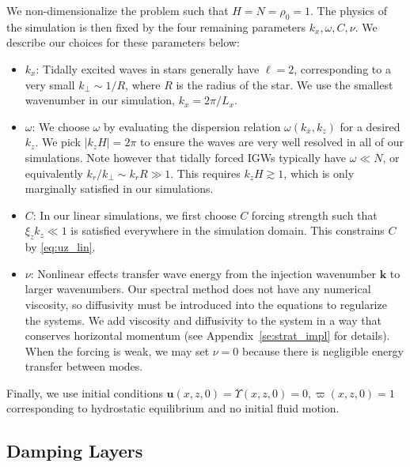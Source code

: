 \documentclass[
        fleqn,
        usenatbib,
    ]{mnras}
\newcommand*{\abs}[1]{\left|#1\right|}
\newcommand*{\bm}[1]{\mathbf{#1}}
\begin{document}
We non-dimensionalize the problem such that $H = N = \rho_0 = 1$. The physics of
the simulation is then fixed by the four remaining parameters $k_{x}, \omega, C,
\nu$. We describe our choices for these parameters below:
\begin{itemize}
    \item $k_{x}$: Tidally excited waves in stars generally have $\ell = 2$,
        corresponding to a very small $k_\perp\sim 1/R$, where $R$ is the radius
        of the star. We use the smallest wavenumber in our simulation,
        $k_x=2\pi/L_x$.

    \item $\omega$: We choose $\omega$ by evaluating the dispersion relation
        $\omega(k_x, k_z)$ for a desired $k_z$. We pick $\abs{k_z H} = 2\pi$ to
        ensure the waves are very well resolved in all of our simulations. Note
        however that tidally forced IGWs typically have $\omega \ll N$, or
        equivalently $k_r/k_\perp \sim k_r R \gg 1$. This requires $k_z H
        \gtrsim 1$, which is only marginally satisfied in our simulations.

    \item $C$: In our linear simulations, we first choose $C$ forcing strength
        such that $\xi_z k_z \ll 1$ is satisfied everywhere in the simulation
        domain. This constrains $C$ by \autoref{eq:uz_lin}.

    \item $\nu$: Nonlinear effects transfer wave energy from the injection
        wavenumber $\bm{k}$ to larger wavenumbers. Our spectral method does not
        have any numerical viscosity, so diffusivity must be introduced into the
        equations to regularize the systems. We add viscosity and diffusivity to
        the system in a way that conserves horizontal momentum (see
        Appendix~\ref{se:strat_impl} for details). When the forcing is weak, we
        may set $\nu=0$ because there is negligible energy transfer between
        modes.
\end{itemize}

Finally, we use initial conditions $\bm{u}(x, z, 0) = \Upsilon(x, z, 0) = 0,
\varpi(x, z, 0) = 1$ corresponding to hydrostatic equilibrium and no initial
fluid motion.

\subsection{Damping Layers}\label{ss:damping}
\end{document}
